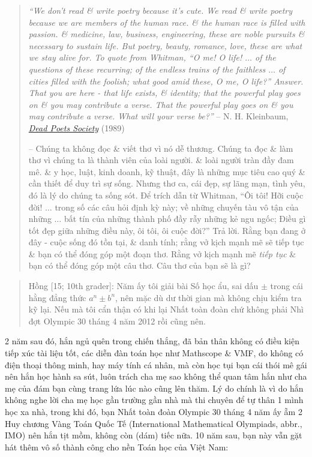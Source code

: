 \documentclass[12pt]{article}
\begin{document}
\begin{quotation}
	{\it``We don't read \& write poetry because it's cute. We read \& write poetry because we are members of the human race. \& the human race is filled with passion. \& medicine, law, business, engineering, these are noble pursuits \& necessary to sustain life. But poetry, beauty, romance, love, these are what we stay alive for. To quote from Whitman, ``O me! O life! $\ldots$ of the questions of these recurring; of the endless trains of the faithless $\ldots$ of cities filled with the foolish; what good amid these, O me, O life?'' Answer. That you are here - that life exists, \& identity; that the powerful play goes on \& you may contribute a verse. That the powerful play \emph{goes on} \& you may contribute a verse. What will your verse be?''} --  {\sc N. H. Kleinbaum}, \href{https://www.imdb.com/title/tt0097165}{\it Dead Poets Society} (1989)
	
	-- Chúng ta không đọc \& viết thơ vì nó dễ thương. Chúng ta đọc \& làm thơ vì chúng ta là thành viên của loài người. \& loài người tràn đầy đam mê. \& y học, luật, kinh doanh, kỹ thuật, đây là những mục tiêu cao quý \& cần thiết để duy trì sự sống. Nhưng thơ ca, cái đẹp, sự lãng mạn, tình yêu, đó là lý do chúng ta sống sót. Để trích dẫn từ Whitman, ``Ôi tôi! Hỡi cuộc đời! $\ldots$ trong số các câu hỏi định kỳ này; về những chuyến tàu vô tận của những $\ldots$ bất tín của những thành phố đầy rẫy những kẻ ngu ngốc; Điều gì tốt đẹp giữa những điều này, ôi tôi, ôi cuộc đời?'' Trả lời. Rằng bạn đang ở đây - cuộc sống đó tồn tại, \& danh tính; rằng vở kịch mạnh mẽ sẽ tiếp tục \& bạn có thể đóng góp một đoạn thơ. Rằng vở kịch mạnh mẽ \emph{tiếp tục} \& bạn có thể đóng góp một câu thơ. Câu thơ của bạn sẽ là gì?
\end{quotation}

\begin{quote}
	{\sf Hồng [15; 10th grader]}: Năm ấy tôi giải bài Số học ẩu, sai dấu $\pm$ trong cái hằng đẳng thức $a^n\pm b^n$, nên mặc dù dư thời gian mà không chịu kiểm tra kỹ lại. Nếu mà tôi cẩn thận có khi lại Nhất toàn đoàn chứ không phải Nhì đợt Olympic 30 tháng 4 năm 2012 rồi cũng nên.
\end{quote}
2 năm sau đó, hắn ngủ quên trong chiến thắng, đã bản thân không có điều kiện tiếp xúc tài liệu tốt, các diễn đàn toán học như Mathscope \& VMF, do không có điện thoại thông minh, hay máy tính cá nhân, mà còn học tụi bạn cái thói mê gái nên hắn học hành sa sút, luôn trách cha mẹ sao không thể quan tâm hắn như cha mẹ của đám bạn cùng trang lứa lúc nào cũng lên thăm. Lý do chính là vì do hắn không nghe lời cha mẹ học gần trường gần nhà mà thi chuyên để tự thân 1 mình học xa nhà, trong khi đó, bạn Nhất toàn đoàn Olympic 30 tháng 4 năm ấy ẵm 2 Huy chương Vàng Toán Quốc Tế (International Mathematical Olympiads, abbr., IMO) nên hắn tịt mồm, không còn (dám) tiếc nữa. 10 năm sau, bạn này vẫn gặt hát thêm vô số thành công cho nền Toán học của Việt Nam:
\end{document}
